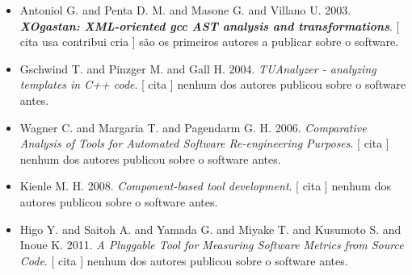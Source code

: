 \begin{itemize}
\item Antoniol G. and Penta D. M. and Masone G. and Villano U.
      2003.
        \textbf{\textit{ XOgastan: XML-oriented gcc AST analysis and transformations}}.
      [
          cita
          usa
          contribui
          cria
      ]
são os primeiros autores a publicar sobre o software.
\item Gschwind T. and Pinzger M. and Gall H.
      2004.
        \textit{ TUAnalyzer - analyzing templates in C++ code}.
      [
          cita
      ]
nenhum dos autores publicou sobre o software antes.
\item Wagner C. and Margaria T. and Pagendarm G. H.
      2006.
        \textit{ Comparative Analysis of Tools for Automated Software Re-engineering Purposes}.
      [
          cita
      ]
nenhum dos autores publicou sobre o software antes.
\item Kienle M. H.
      2008.
        \textit{ Component-based tool development}.
      [
          cita
      ]
nenhum dos autores publicou sobre o software antes.
\item Higo Y. and Saitoh A. and Yamada G. and Miyake T. and Kusumoto S. and Inoue K.
      2011.
        \textit{ A Pluggable Tool for Measuring Software Metrics from Source Code}.
      [
          cita
      ]
nenhum dos autores publicou sobre o software antes.
\end{itemize}

